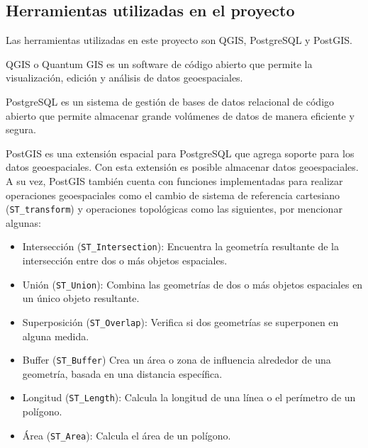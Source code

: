 
\subsection{Herramientas utilizadas en el proyecto}

Las herramientas utilizadas en este proyecto son QGIS, PostgreSQL y PostGIS.

QGIS o Quantum GIS es un software de código abierto que permite la
visualización, edición y análisis de datos geoespaciales. 

PostgreSQL es un sistema de gestión de bases de datos relacional de código
abierto que permite almacenar grande volúmenes de datos de manera eficiente y
segura.

PostGIS es una extensión espacial para PostgreSQL que agrega soporte para los
datos geoespaciales. Con esta extensión es posible almacenar datos
geoespaciales. A su vez, PostGIS también cuenta con funciones implementadas para
realizar operaciones geoespaciales como el cambio de sistema de referencia
cartesiano (\texttt{ST\_transform}) y operaciones topológicas como las
siguientes, por mencionar algunas:

\begin{itemize}
\item Intersección (\texttt{ST\_Intersection}): Encuentra la geometría resultante de la
intersección entre dos o más objetos espaciales.

\item Unión (\texttt{ST\_Union}): Combina las geometrías de dos o más objetos espaciales en un
único objeto resultante.

\item Superposición (\texttt{ST\_Overlap}): Verifica si dos geometrías se superponen en alguna
medida.

\item Buffer (\texttt{ST\_Buffer}) Crea un área o zona de influencia alrededor de una geometría, basada en
una distancia específica.

\item Longitud (\texttt{ST\_Length}): Calcula la longitud de una línea o el perímetro de un
polígono.

\item Área (\texttt{ST\_Area}): Calcula el área de un polígono.

\end{itemize}